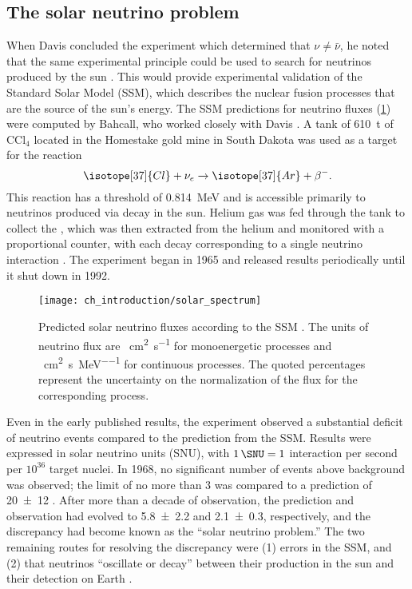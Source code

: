 \subsection{The solar neutrino problem}
\label{subsec:homestake}

When Davis concluded the experiment which determined that $\nu\neq\bar{\nu}$,
he noted that the same experimental principle could be used
to search for neutrinos produced by the sun \cite{davis_diff_nuebar}.
This would provide experimental validation of the Standard Solar Model (SSM),
which describes the nuclear fusion processes
that are the source of the sun's energy.
The SSM predictions for neutrino fluxes (\cref{fig:solarflux})
were computed by Bahcall,
who worked closely with Davis \cite{bahcall2004}.
A tank of \SI{610}{\tonne} of $\text{CCl}_4$
located in the Homestake gold mine in South Dakota
was used as a target for the reaction
\begin{equation}\label{eq:davis_nu}
    \isotope[37]{Cl} + \nu_e \to \isotope[37]{Ar} + \beta^-.
\end{equation}
This reaction has a threshold of \SI{0.814}{\MeV} \cite{solar_review}
and is accessible primarily to neutrinos
produced via  decay in the sun.
Helium gas was fed through the tank
to collect the ,
which was then extracted from the helium
and monitored with a proportional counter,
with each decay corresponding to a single neutrino interaction \cite{homestake1968}.
The experiment began in 1965 and released results periodically
until it shut down in 1992.

\begin{figure}
    \centering
    \texttt{[image: ch\_introduction/solar\_spectrum]}
    \caption[SSM solar neutrino fluxes]{
        Predicted solar neutrino fluxes according to the SSM \cite{bahcall2004}.
        The units of neutrino flux are
        \si[per-mode=reciprocal]{\per\square\cm\per\second} for monoenergetic processes
        and \si[per-mode=reciprocal]{\per\square\cm\per\second\per\MeV}
        for continuous processes.
        The quoted percentages represent the uncertainty
        on the normalization of the flux for the corresponding process.
    }
    \label{fig:solarflux}
\end{figure}

Even in the early published results,
the experiment observed a substantial deficit of neutrino events
compared to the prediction from the SSM.
Results were expressed in solar neutrino units (SNU),
with $\SI{1}{\SNU} = 1$ interaction per second per $10^{36}$ target nuclei.
In 1968, no significant number of events above background was observed;
the limit of no more than \SI{3}{\SNU} was compared to a prediction of
\SI{20\pm12}{\SNU} \cite{homestake1968}.
After more than a decade of observation,
the prediction and observation had evolved to \SI{5.8\pm2.2}{\SNU}
and \SI{2.1\pm0.3}{\SNU}, respectively,
and the discrepancy had become known as the ``solar neutrino problem.''
The two remaining routes for resolving the discrepancy were
(1) errors in the SSM, and (2) that neutrinos ``oscillate or decay''
between their production in the sun and their detection on Earth \cite{davis1985}.

